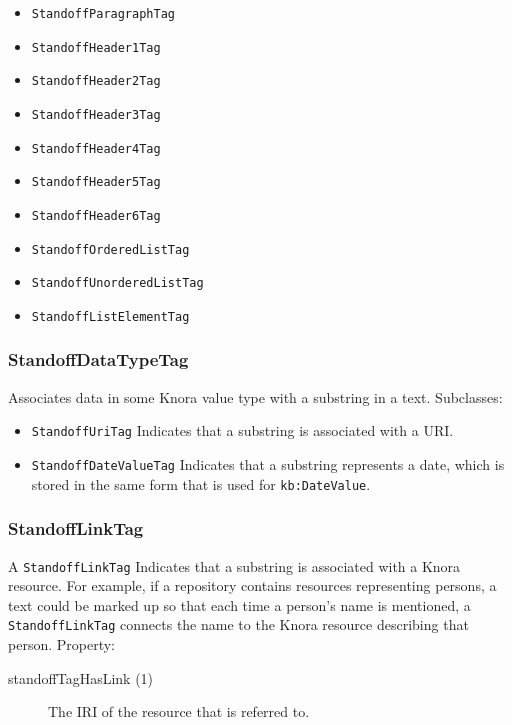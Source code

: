 \documentclass[12pt, a4paper]{article}
\begin{document}
\begin{itemize}
	\item \texttt{StandoffParagraphTag}
	\item \texttt{StandoffHeader1Tag}
	\item \texttt{StandoffHeader2Tag}
	\item \texttt{StandoffHeader3Tag}
	\item \texttt{StandoffHeader4Tag}
	\item \texttt{StandoffHeader5Tag}
	\item \texttt{StandoffHeader6Tag}
	\item \texttt{StandoffOrderedListTag}
	\item \texttt{StandoffUnorderedListTag}
	\item \texttt{StandoffListElementTag}
\end{itemize}

\subsubsection{StandoffDataTypeTag}

Associates data in some Knora value type with a substring in a text. Subclasses:

\begin{itemize}
	\item \texttt{StandoffUriTag} Indicates that a substring is associated with a URI.
	\item \texttt{StandoffDateValueTag} Indicates that a substring represents a date, which is stored in the same form that is used for \texttt{kb:DateValue}.
\end{itemize}

\subsubsection{StandoffLinkTag}

\label{subsubsec:standoff-link}

A \texttt{StandoffLinkTag} Indicates that a substring is associated with a Knora resource. For example, if a repository contains resources representing persons, a text could be marked up so that each time a person's name is mentioned, a \texttt{StandoffLinkTag} connects the name to the Knora resource describing that person. Property:

\begin{description}
	\item[standoffTagHasLink (1)] The IRI of the resource that is referred to.
\end{description}
\end{document}
